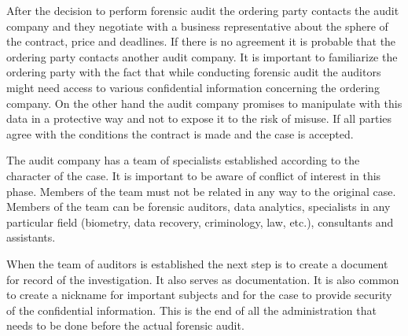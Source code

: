 After the decision to perform forensic audit the ordering party contacts the audit company and they negotiate with a business representative about the sphere of the contract, price and deadlines. If there is no agreement it is probable that the ordering party contacts another audit company. It is important to familiarize the ordering party with the fact that while conducting forensic audit the auditors might need access to various confidential information concerning the ordering company. On the other hand the audit company promises to manipulate with this data in a protective way and not to expose it to the risk of misuse. If all parties agree with the conditions the contract is made and the case is accepted. 

The audit company has a team of specialists established according to the character of the case. It is important to be aware of conflict of interest in this phase. Members of the team must not be related in any way to the original case. Members of the team can be forensic auditors, data analytics, specialists in any particular field (biometry, data recovery, criminology, law, etc.), consultants and assistants. 

When the team of auditors is established the next step is to create a document for record of the investigation. It also serves as documentation. It is also common to create a nickname for important subjects and for the case to provide security of the confidential information. This is the end of all the administration that needs to be done before the actual forensic audit. %

